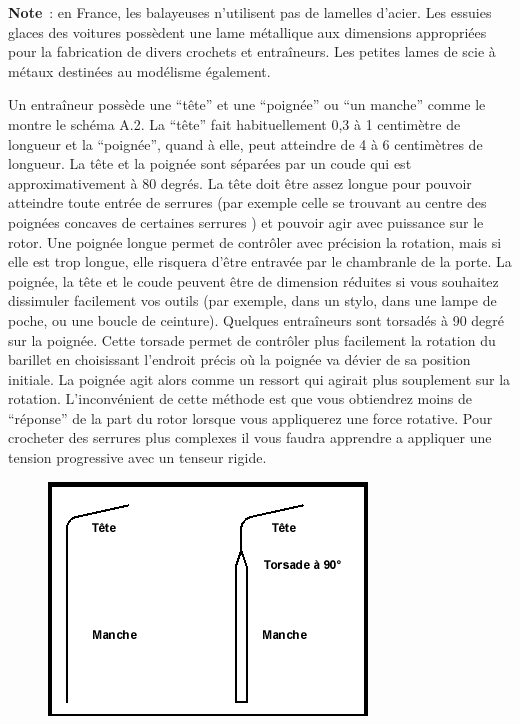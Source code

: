 \documentclass[a4paper,french,11pt,twoside]{report}
\begin{document}
\medskip
\noindent \textbf{Note}~: en France, les balayeuses n'utilisent pas de lamelles d'acier. Les essuies glaces des voitures possèdent une lame métallique aux dimensions appropriées pour la fabrication de divers crochets et entraîneurs. Les petites lames de scie à métaux destinées au modélisme également.

\medskip
Un entraîneur possède une \enquote{tête} et une \enquote{poignée} ou \enquote{un manche} comme le montre le schéma A.2. La \enquote{tête} fait habituellement 0,3 à 1 centimètre de longueur et la \enquote{poignée}, quand à elle, peut atteindre de 4 à 6 centimètres de longueur. La tête et la poignée sont séparées par un coude qui est approximativement à 80 degrés. La tête doit être assez longue pour pouvoir atteindre toute entrée de serrures (par exemple celle se trouvant au centre des poignées concaves de certaines serrures ) et pouvoir agir avec puissance sur le rotor. Une poignée longue permet de contrôler avec précision la rotation, mais si elle est trop longue, elle risquera d'être entravée par le chambranle de la porte. La poignée, la tête et le coude peuvent être de dimension réduites si vous souhaitez dissimuler facilement vos outils (par exemple, dans un stylo, dans une lampe de poche, ou une boucle de ceinture). Quelques entraîneurs sont torsadés à 90 degré sur la poignée. Cette torsade permet de contrôler plus facilement la rotation du barillet en choisissant l'endroit précis où la poignée va dévier de sa position initiale. La poignée agit alors comme un ressort qui agirait plus souplement sur la rotation. L'inconvénient de cette méthode est que vous obtiendrez moins de \enquote{réponse} de la part du rotor lorsque vous appliquerez une force rotative. Pour crocheter des serrures plus complexes il vous faudra apprendre a appliquer une tension progressive avec un tenseur rigide.

\begin{figure}[h]
  \begin{center}
    \includegraphics[scale=0.8]{images/Image28}
    \caption{}
  \end{center}
\end{figure}
\end{document}
